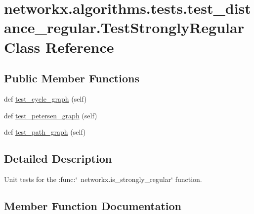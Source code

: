 \hypertarget{classnetworkx_1_1algorithms_1_1tests_1_1test__distance__regular_1_1TestStronglyRegular}{}\section{networkx.\+algorithms.\+tests.\+test\+\_\+distance\+\_\+regular.\+Test\+Strongly\+Regular Class Reference}
\label{classnetworkx_1_1algorithms_1_1tests_1_1test__distance__regular_1_1TestStronglyRegular}
\subsection*{Public Member Functions}
\begin{DoxyCompactItemize}
\item 
def \hyperlink{classnetworkx_1_1algorithms_1_1tests_1_1test__distance__regular_1_1TestStronglyRegular_ac48b170b342e36bdadabef263cf5d3ae}{test\+\_\+cycle\+\_\+graph} (self)
\item 
def \hyperlink{classnetworkx_1_1algorithms_1_1tests_1_1test__distance__regular_1_1TestStronglyRegular_a384349064cccdf18194afb0b5bb0ce8a}{test\+\_\+petersen\+\_\+graph} (self)
\item 
def \hyperlink{classnetworkx_1_1algorithms_1_1tests_1_1test__distance__regular_1_1TestStronglyRegular_a283b47350a78eba419b656133e1e9a61}{test\+\_\+path\+\_\+graph} (self)
\end{DoxyCompactItemize}


\subsection{Detailed Description}
\begin{DoxyVerb}Unit tests for the :func:`~networkx.is_strongly_regular`
function.\end{DoxyVerb}
 

\subsection{Member Function Documentation}
\mbox{\label{classnetworkx_1_1algorithms_1_1tests_1_1test__distance__regular_1_1TestStronglyRegular_ac48b170b342e36bdadabef263cf5d3ae}} 
